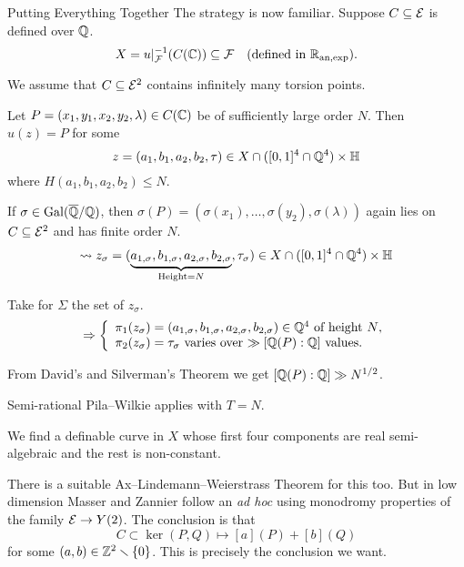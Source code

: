 \documentclass{beamer}
\begin{document}
\begin{frame}{Putting Everything Together}
  The strategy is now familiar. Suppose $C\subseteq{\mathcal E}$ is defined over
  ${\mathbb{Q}}$. 
  \begin{equation*}
    X = u|_{{\mathcal F}}^{-1}(C({\mathbb{C}})) \subseteq {\mathcal F} \quad\text{(defined in ${{\mathbb{R}}_{\mathrm{an,exp}}}$)}.
  \end{equation*}

  We assume that $C\subseteq{\mathcal E}^2$ contains infinitely many torsion points.

  Let $P=(x_1,y_1,x_2,y_2,\lambda)\in C({\mathbb{C}})$
  be of sufficiently large order $N$.
  Then $u(z) = P$
  for some $$z=(a_1,b_1,a_2,b_2,\tau)\in X\cap ([0,1]^4\cap{\mathbb{Q}}^4)\times {\mathbb{H}}$$
  where $H(a_1,b_1,a_2,b_2)\le N$.


  If $\sigma\in \mathrm{Gal}({\overline{\mathbb{Q}}}/{\mathbb{Q}})$, then $\sigma(P) =
  (\sigma(x_1),\ldots,\sigma(y_2),\sigma(\lambda))$  again lies on
  $C\subseteq{\mathcal E}^2$ and has finite order $N$.
  $$\leadsto z_\sigma =
  (\underbrace{a_{1,\sigma},b_{1,\sigma},a_{2,\sigma},b_{2,\sigma}}_{\text{Height}
    = N},\tau_\sigma)
  \in X\cap ([0,1]^4\cap{\mathbb{Q}}^4)\times {\mathbb{H}}$$
\end{frame}

\begin{frame}

  Take for $\Sigma$ the set of $z_\sigma$.
  \begin{equation*}
    \Rightarrow \left\{
      \begin{array}{l}
        \pi_1(z_\sigma) =
        (a_{1,\sigma},b_{1,\sigma},a_{2,\sigma},b_{2,\sigma})\in{\mathbb{Q}}^4
        \text{ of height $N$},\\
   \pi_2(z_\sigma)=\tau_\sigma  \text{ varies over $\gg [{\mathbb{Q}}(P):{\mathbb{Q}}]$ values.}
      \end{array}\right.
  \end{equation*}
  
  From David's and Silverman's Theorem we get   $[{\mathbb{Q}}(P):{\mathbb{Q}}]\gg N^{1/2}$.

  Semi-rational Pila--Wilkie applies with $T=N$.
  
  We find a definable curve  in $X$ whose
  first four components are real semi-algebraic and the rest is
  non-constant.
  
  There is a suitable Ax--Lindemann--Weierstrass Theorem for this too.
  But in low dimension Masser and Zannier follow an \textit{ad hoc}
  using monodromy properties of the family ${\mathcal E}\rightarrow Y(2)$. The
  conclusion is that
  $$ C \subset \ker{(P,Q)\mapsto [a](P)+[b](Q)}$$
  for some
  $(a,b)\in{\mathbb{Z}}^2\smallsetminus\{0\}$. This is precisely the conclusion we want.
\end{frame}
\end{document}
